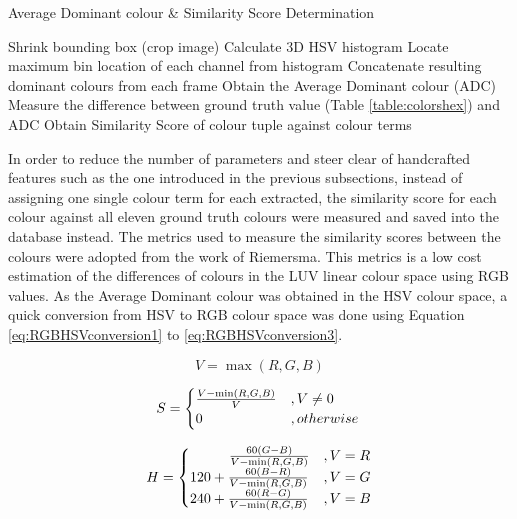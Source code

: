 \begin{algorithm}[H]
  \caption{Average Dominant colour \& Similarity Score Determination}
  \label{algo:ADC}
  \begin{algorithmic}[1]
        \STATE Shrink bounding box (crop image)
        \STATE Calculate 3D HSV histogram
        \STATE Locate maximum bin location of each channel from histogram
        \STATE Concatenate resulting dominant colours from each frame
        \STATE Obtain the Average Dominant colour (ADC)
        \STATE Measure the difference between ground truth value (Table \ref{table:colorshex}) and ADC
        \STATE Obtain Similarity Score of colour tuple against colour terms
    \ENDFOR
  \end{algorithmic}
\end{algorithm}

In order to reduce the number of parameters and steer clear of handcrafted features such as the one introduced in the previous subsections, instead of assigning one single colour term for each extracted, the similarity score for each colour against all eleven ground truth colours were measured and saved into the database instead. The metrics used to measure the similarity scores between the colours were adopted from the work of Riemersma\cite{riemersma}. This metrics is a low cost estimation of the differences of colours in the LUV linear colour space using RGB values. As the Average Dominant colour was obtained in the HSV colour space, a quick conversion from HSV to RGB colour space was done using Equation \ref{eq:RGBHSVconversion1} to \ref{eq:RGBHSVconversion3}.


\begin{equation}
\label{eq:RGBHSVconversion1}
V = \max(R,G,B)
\end{equation}

\begin{equation}
\label{eq:RGBHSVconversion2}
S = \begin{cases}\frac{V - \min(R,G,B)}{V} & , V \neq 0\\
0 & , otherwise \end{cases} \\
\end{equation}

\begin{equation}
\label{eq:RGBHSVconversion3}
H = \begin{cases}
\hspace{2.8em} \frac{60(G-B)}{V-\min(R,G,B)} & ,V = R\\
120 + \frac{60(B-R)}{V-\min(R,G,B)} & ,V = G\\
240 + \frac{60(R-G)}{V-\min(R,G,B)} & ,V = B
\end{cases}
\end{equation}

